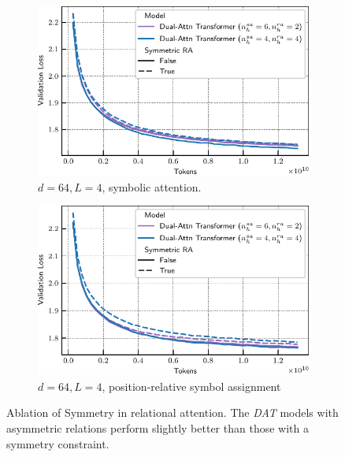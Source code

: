 \begin{figure}
    \centering
    \begin{subfigure}[t]{0.45\textwidth}
        \centering
        \includegraphics[width=\textwidth]{figs/experiments/tiny_stories/d64L4_ablation_symmetry_symmattn.pdf}
        \caption{$d = 64, L = 4$, symbolic attention.}
    \end{subfigure}
    \hfill
    \begin{subfigure}[t]{0.45\textwidth}
        \centering
        \includegraphics[width=\textwidth]{figs/experiments/tiny_stories/d64L4_ablation_symmetry_posrelsym.pdf}
        \caption{$d = 64, L = 4$, position-relative symbol assignment}
    \end{subfigure}
    \caption{Ablation of Symmetry in relational attention. The \textit{DAT} models with asymmetric relations perform slightly better than those with a symmetry constraint.}\label{fig:ablation_symmetry}
\end{figure}

